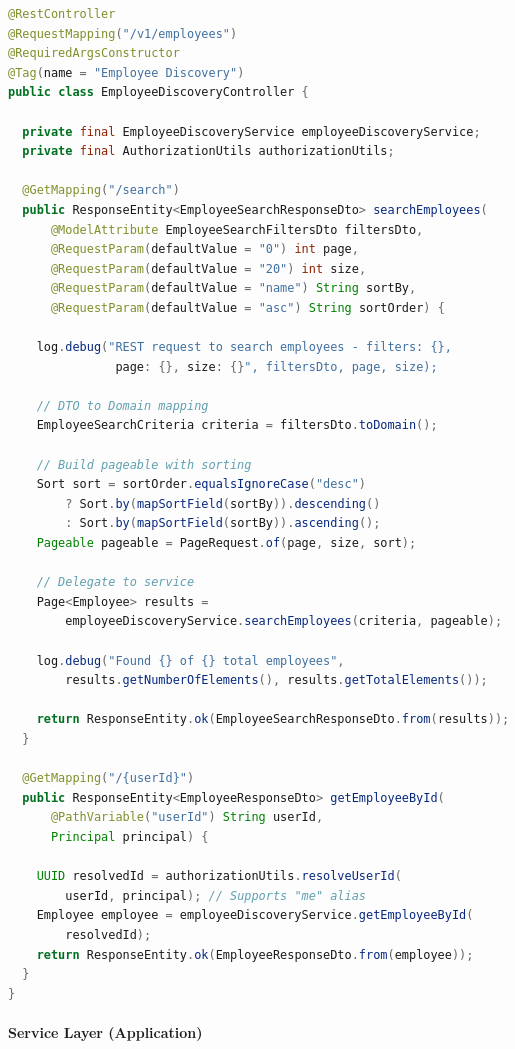 \begin{lstlisting}[language=Java, caption=EmployeeDiscoveryController - REST Endpoint, label=lst:employee_controller]
@RestController
@RequestMapping("/v1/employees")
@RequiredArgsConstructor
@Tag(name = "Employee Discovery")
public class EmployeeDiscoveryController {

  private final EmployeeDiscoveryService employeeDiscoveryService;
  private final AuthorizationUtils authorizationUtils;

  @GetMapping("/search")
  public ResponseEntity<EmployeeSearchResponseDto> searchEmployees(
      @ModelAttribute EmployeeSearchFiltersDto filtersDto,
      @RequestParam(defaultValue = "0") int page,
      @RequestParam(defaultValue = "20") int size,
      @RequestParam(defaultValue = "name") String sortBy,
      @RequestParam(defaultValue = "asc") String sortOrder) {

    log.debug("REST request to search employees - filters: {}, 
               page: {}, size: {}", filtersDto, page, size);

    // DTO to Domain mapping
    EmployeeSearchCriteria criteria = filtersDto.toDomain();

    // Build pageable with sorting
    Sort sort = sortOrder.equalsIgnoreCase("desc")
        ? Sort.by(mapSortField(sortBy)).descending()
        : Sort.by(mapSortField(sortBy)).ascending();
    Pageable pageable = PageRequest.of(page, size, sort);

    // Delegate to service
    Page<Employee> results = 
        employeeDiscoveryService.searchEmployees(criteria, pageable);

    log.debug("Found {} of {} total employees",
        results.getNumberOfElements(), results.getTotalElements());

    return ResponseEntity.ok(EmployeeSearchResponseDto.from(results));
  }

  @GetMapping("/{userId}")
  public ResponseEntity<EmployeeResponseDto> getEmployeeById(
      @PathVariable("userId") String userId,
      Principal principal) {

    UUID resolvedId = authorizationUtils.resolveUserId(
        userId, principal); // Supports "me" alias
    Employee employee = employeeDiscoveryService.getEmployeeById(
        resolvedId);
    return ResponseEntity.ok(EmployeeResponseDto.from(employee));
  }
}
\end{lstlisting}

\paragraph{Service Layer (Application)}\mbox{}\vspace{4pt}

